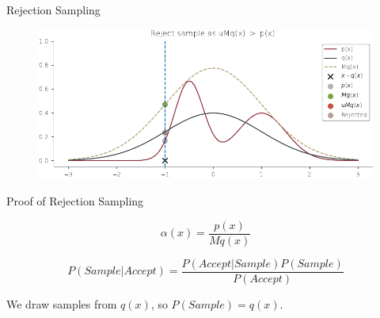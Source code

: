\documentclass{beamer}
\begin{document}
    \begin{frame}{Rejection Sampling}
        \begin{figure}
            \centering
            \includegraphics[scale = 0.75]{../figures/sampling/rejection-sampling--1.0-True-True-True-True-True-True-True-True.pdf}
        \end{figure}
    \end{frame}

    \begin{frame}{Proof of Rejection Sampling}
        \begin{tcolorbox}[colback=metropolisblue!5,colframe=metropolisblue,title={Acceptance Probability $\alpha(x)$}]
            \begin{equation}
              \alpha(x) = \frac{p(x)}{M q(x)}
            \end{equation}
        \end{tcolorbox}
       
        \begin{tcolorbox}[colback=metropolisblue!5,colframe=metropolisblue,title={Bayes Rule for Acceptance}]
            \begin{equation}
                P(Sample|Accept) = \frac{P(Accept|Sample) P(Sample)}{P(Accept)}
            \end{equation}
        \end{tcolorbox}

        \begin{tcolorbox}[colback=metropolisblue!5,colframe=metropolisblue,title={P(Sample)}]
            We draw samples from $q(x)$, so $P(Sample) = q(x)$.
        \end{tcolorbox}
    \end{frame}
\end{document}
